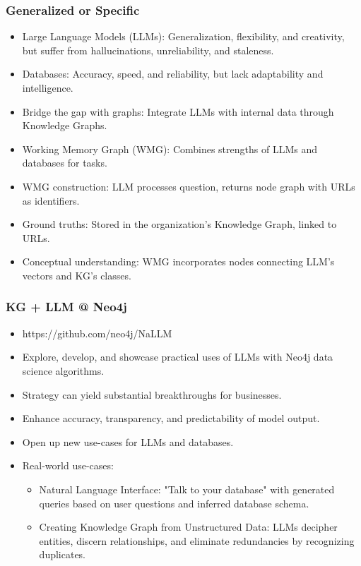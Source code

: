 \begin{frame}[fragile]\frametitle{Generalized or Specific}
\begin{itemize}
\item Large Language Models (LLMs): Generalization, flexibility, and creativity, but suffer from hallucinations, unreliability, and staleness.
\item Databases: Accuracy, speed, and reliability, but lack adaptability and intelligence.
\item Bridge the gap with graphs: Integrate LLMs with internal data through Knowledge Graphs.
\item Working Memory Graph (WMG): Combines strengths of LLMs and databases for tasks.
\item WMG construction: LLM processes question, returns node graph with URLs as identifiers.
\item Ground truths: Stored in the organization's Knowledge Graph, linked to URLs.
\item Conceptual understanding: WMG incorporates nodes connecting LLM's vectors and KG's classes.
\end{itemize}
\end{frame}


\begin{frame}[fragile]\frametitle{KG + LLM @ Neo4j}
\begin{itemize}
\item https://github.com/neo4j/NaLLM
\item Explore, develop, and showcase practical uses of LLMs with Neo4j data science algorithms.
\item Strategy can yield substantial breakthroughs for businesses.
\item Enhance accuracy, transparency, and predictability of model output.
\item Open up new use-cases for LLMs and databases.
\item Real-world use-cases:

	\begin{itemize}
	\item Natural Language Interface: "Talk to your database" with generated queries based on user questions and inferred database schema.
	\item Creating Knowledge Graph from Unstructured Data: LLMs decipher entities, discern relationships, and eliminate redundancies by recognizing duplicates.
	\end{itemize}

\end{itemize}
\end{frame}


